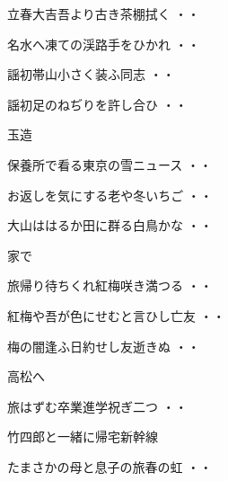 \vspace{0.4cm}
\begin{shiika}立春大吉吾より古き茶棚拭く
\hfill{・・}\end{shiika}
\vspace{0.4cm}
\begin{shiika}名水へ凍ての渓路手をひかれ
\hfill{・・}\end{shiika}
\vspace{0.4cm}
\begin{shiika}謡初帯山小さく装ふ同志
\hfill{・・}\end{shiika}
\vspace{0.4cm}
\begin{shiika}謡初足のねぢりを許し合ひ
\hfill{・・}\end{shiika}
\vspace{0.4cm}
玉造
\begin{shiika}保養所で看る東京の雪ニュース
\hfill{・・}\end{shiika}
\begin{shiika}お返しを気にする老や冬いちご
\hfill{・・}\end{shiika}
\begin{shiika}大山ははるか田に群る白鳥かな
\hfill{・・}\end{shiika}
\vspace{0.4cm}
家で
\begin{shiika}旅帰り待ちくれ紅梅咲き満つる
\hfill{・・}\end{shiika}
\begin{shiika}紅梅や吾が色にせむと言ひし亡友
\hfill{・・}\end{shiika}
\begin{shiika}梅の闇逢ふ日約せし友逝きぬ
\hfill{・・}\end{shiika}
\vspace{0.4cm}
高松へ
\begin{shiika}旅はずむ卒業進学祝ぎ二つ
\hfill{・・}\end{shiika}
\vspace{0.4cm}
竹四郎と一緒に帰宅新幹線
\begin{shiika}たまさかの母と息子の旅春の虹
\hfill{・・}\end{shiika}
